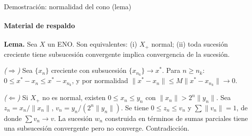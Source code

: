 \documentclass{beamer}
\newcommand{\Xp}{X_{+}}               %
\begin{document}
\begin{frame}[noframenumbering]{Demostración: normalidad del cono (lema)}
\framesubtitle{Material de respaldo}

\small
\textbf{Lema.} Sea $X$ un ENO. Son equivalentes:
(i) $\Xp$ normal; (ii) toda sucesión creciente tiene subsucesión
convergente implica convergencia de la sucesión.

\medskip
\textit{($\Rightarrow$)} Sea $\{x_n\}$ creciente con subsucesión $\{x_{n_k}\}\to x^*$.
Para $n\ge n_k$: $0\le x^*-x_n\le x^*-x_{n_k}$, y por normalidad
$\|x^*-x_n\|\le M\|x^*-x_{n_k}\|\to 0$.

\textit{($\Leftarrow$)} Si $\Xp$ no es normal, existen $0\le x_n\le y_n$
con $\|x_n\|>2^n\|y_n\|$. Sea $z_n=x_n/\|x_n\|$, $v_n=y_n/(2^n\|y_n\|)$.
Se tiene $0\le z_n\le v_n$ y $\sum\|v_n\|=1$, de donde $\sum v_n\to v$.
La sucesión $w_n$ construida en términos de sumas parciales tiene
una subsucesión convergente pero no converge. Contradicción.
\end{frame}
\end{document}
